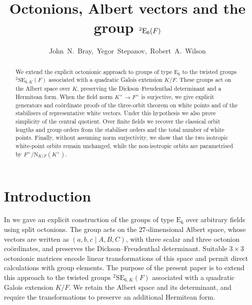 \documentclass{amsart}
\title
[Octonions, Albert vectors and ${}^2\E_6(F)$]
{Octonions, Albert vectors and the group ${}^2\E_6(F)$}
\author{John~N.~Bray,\ Yegor~Stepanov,\ Robert~A.~Wilson}
\def\NN{\mathord{\mathrm{N}}}
\newcommand{\SE}{\mathrm{SE}}
\newcommand{\E}{\mathrm{E}}
\theoremstyle{plain}
\numberwithin{theorem}{section}
\theoremstyle{definition}
\begin{document}
\begin{abstract}
We extend the explicit octonionic approach to groups of type $\E_6$ to
the twisted groups ${}^2\SE_{6,K}(F)$ associated with a quadratic Galois
extension $K/F$. These groups act on the Albert space over $K$,
preserving the Dickson--Freudenthal determinant and a Hermitean form.
When the field norm $K^{\times}\to F^{\times}$ is surjective, we give
explicit generators and co\"ordinate proofs of the three-orbit theorem
on white points and of the stabilisers of representative white vectors.
Under this hypothesis we also prove simplicity of the central quotient.
Over finite fields we recover the classical orbit lengths and group orders from the
stabiliser orders and the total number of white points. Finally, without
assuming norm surjectivity, we show that the two isotropic white-point
orbits remain unchanged, while the non-isotropic orbits are parametrised
by $F^{\times}/\NN_{K/F}(K^{\times})$.
\end{abstract}

\maketitle

\tableofcontents

\section{Introduction}

In \cite{BSW1} we gave an explicit construction of the groups of type
$\E_6$ over arbitrary fields using split octonions. The group acts on
the $27$-dimensional Albert space, whose vectors are written as
$(a,b,c\mid A,B,C)$, with three scalar and three octonion co\"ordinates,
and preserves the Dickson--Freudenthal determinant. Suitable
$3\times3$ octonionic matrices encode linear transformations of this
space and permit direct calculations with group elements. The purpose
of the present paper is to extend this approach to the twisted groups
${}^2\SE_{6,K}(F)$ associated with a quadratic Galois extension $K/F$.
We retain the Albert space and its determinant, and require the
transformations to preserve an additional Hermitean form.
\end{document}
